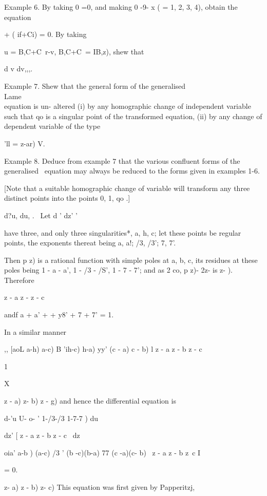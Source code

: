 Example 6. By taking 0 =0, and making 0 -9- x ( = 1, 2, 3, 4), obtain
the equation

  + ( if+Ci) = 0. By taking

u = B,C+C\ r-v, B,C+C\ = IB,z), shew that

 d v dv,,,.

%
%

Example 7. Shew that the general form of the generalised \\Lame\\ equation
is un- altered (i) by any homographic change of independent variable
such that qo is a singular point of the transformed equation, (ii) by
any change of dependent variable of the type

'll = z-ar) V.

Example 8. Deduce from example 7 that the various confluent forms of
the generalised \Lame\ equation may always be reduced to the forms given
in examples 1-6.

[Note that a suitable homographic change of variable will transform
any three distinct points into the points 0, 1, qo .]


d?u, du, . \ Let d ' dz' '

have three, and only three singularities*, a, h, c; let these points
be regular points, the exponents thereat being a, a!; /3, /3'; 7,
7'.

Then p z) is a rational function with simple poles at a, b, c, its
residues at these poles being 1 - a - a', 1 - /3 - /S', 1 - 7 - 7';
and as 2 co, p z)- 2z- is z- ). Therefore

  z - a z - z - c

andf a + a' + + y8' + 7 + 7' = 1.

In a similar manner

,, [aoL a-h) a-c) B 'ih-c) h-a) yy' (c - a) c - b) l z - a z - b z - c

1

X

 z - a) z- b) z - g) and hence the differential equation is

d-'u U- o- ' 1-/3-/3 1-7-7 ) du

dz' [ z - a z - b z - c \ dz

  oia' a-b ) (a-c) /3 ' (b -c)(b-a) 77 (c -a)(c- b) \ z - a z - b z~c
I

= 0.

 z- a) z - b) z- c) This equation was first given by Papperitzj,

